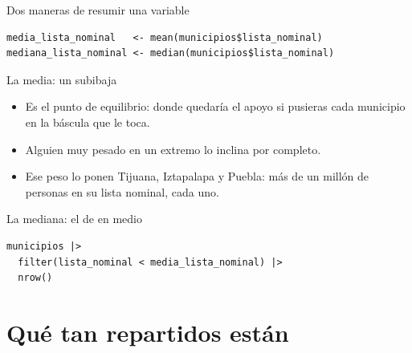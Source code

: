 \begin{frame}[fragile]{Dos maneras de resumir una variable}
\begin{lstlisting}
media_lista_nominal   <- mean(municipios$lista_nominal)
mediana_lista_nominal <- median(municipios$lista_nominal)
\end{lstlisting}

  \vspace{0.6em}
\end{frame}

\begin{frame}{La media: un subibaja}
  \vspace{0.2em}
  \begin{itemize}\setlength{\itemsep}{0.85em}
    \item<1-> Es el \ac{punto de equilibrio}: donde quedaría el apoyo si
          pusieras cada municipio en la báscula que le toca.
    \item<2-> Alguien muy pesado en un extremo lo inclina por completo.
    \item<3-> Ese peso lo ponen Tijuana, Iztapalapa y Puebla: más de un
          millón de personas en su lista nominal, cada uno.
  \end{itemize}
\end{frame}

\begin{frame}[fragile]{La mediana: el de en medio}
\begin{lstlisting}
municipios |>
  filter(lista_nominal < media_lista_nominal) |>
  nrow()
\end{lstlisting}

  \vspace{0.7em}
\end{frame}

\section{Qué tan repartidos están}

